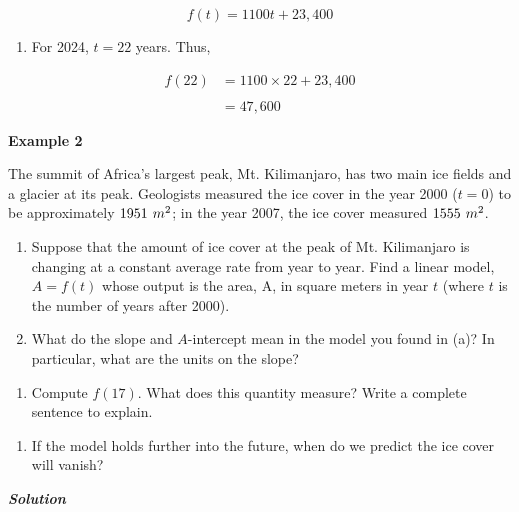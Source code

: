 \documentclass[
  letterpaper,
  DIV=11,
  numbers=noendperiod]{scrreprt}
\providecommand{\tightlist}{%
  \setlength{\itemsep}{0pt}\setlength{\parskip}{0pt}}\usepackage{longtable,booktabs,array}
\begin{document}
\[f(t) = 1100t+23,400\]

\begin{enumerate}
\def\labelenumi{\alph{enumi})}
\setcounter{enumi}{2}
\tightlist
\item
  For 2024, \(t=22\) years. Thus,
\end{enumerate}

\[
\begin{aligned}
f(22) &= 1100\times22+23,400\\\\&=47,600
\end{aligned}
\]

\textbf{Example 2}

The summit of Africa's largest peak, Mt. Kilimanjaro, has two main ice
fields and a glacier at its peak. Geologists measured the ice cover in
the year 2000 (\(t = 0\)) to be approximately \(1951\hspace{.05in}m^2\);
in the year 2007, the ice cover measured \(1555 \hspace{.05in}m^2\).

\begin{enumerate}
\def\labelenumi{\alph{enumi})}
\item
  Suppose that the amount of ice cover at the peak of Mt. Kilimanjaro is
  changing at a constant average rate from year to year. Find a linear
  model, \(A=f(t)\) whose output is the area, A, in square meters in
  year \(t\) (where \(t\) is the number of years after 2000).
\item
  What do the slope and \(A\)-intercept mean in the model you found in
  (a)? In particular, what are the units on the slope?
\end{enumerate}

\begin{enumerate}
\def\labelenumi{\Alph{enumi})}
\setcounter{enumi}{2}
\tightlist
\item
  Compute \(f(17)\). What does this quantity measure? Write a complete
  sentence to explain.
\end{enumerate}

\begin{enumerate}
\def\labelenumi{\alph{enumi})}
\setcounter{enumi}{3}
\tightlist
\item
  If the model holds further into the future, when do we predict the ice
  cover will vanish?
\end{enumerate}

\textbf{\emph{Solution}}
\end{document}
